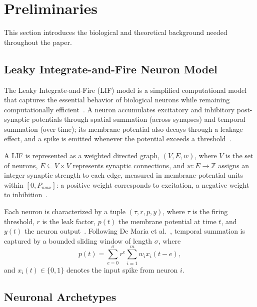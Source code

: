 \documentclass[
]{ceurart}
\begin{document}
\section{Preliminaries}
\label{sec:preliminaries}

This section introduces the biological and theoretical background needed throughout the paper.

\subsection{Leaky Integrate-and-Fire Neuron Model}
\label{sec:lif}

The Leaky Integrate-and-Fire (LIF) model is a simplified computational model
that captures the essential behavior of biological neurons while remaining
computationally efficient~\cite{Lapicque1907,Gerstner2002}. A neuron
accumulates excitatory and inhibitory post-synaptic potentials through
spatial summation (across synapses) and temporal summation (over time); its
membrane potential also decays through a leakage effect, and a spike is
emitted whenever the potential exceeds a threshold~\cite{DeMaria2020,Gerstner2002,Purves2006}.

A LIF is represented as a weighted directed graph,
$(V, E, w)$, where $V$ is the set of neurons, $E \subseteq V \times V$
represents synaptic connections, and $w : E \to \mathbb{Z}$ assigns an
integer synaptic strength to each edge, measured in membrane-potential units
within $[0, P_{max}]$: a positive weight corresponds to excitation, a
negative weight to inhibition~\cite{DeMaria2020}.

Each neuron is characterized by a tuple $(\tau, r, p, y)$, where $\tau$ is the
firing threshold, $r$ is the leak factor, $p(t)$ the membrane potential
at time $t$, and $y(t)$ the neuron output~\cite{Lapicque1907,DeMaria2020}.
Following De Maria et al.~\cite{DeMaria2020}, temporal summation is captured
by a bounded sliding window of length $\sigma$, where
\[
p(t)=\sum_{e=0}^{\sigma} r^{e}\sum_{i=1}^{m} w_i x_i(t-e),
\]
and $x_i(t)\in\{0,1\}$ denotes the input spike from neuron $i$.

\subsection{Neuronal Archetypes}
\label{sec:archetypes}
\end{document}
